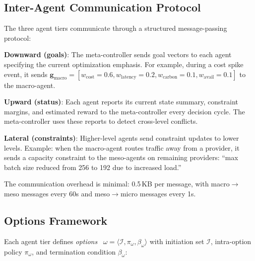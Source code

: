 \documentclass[conference,10pt]{IEEEtran}
\begin{document}
\subsection{Inter-Agent Communication Protocol}

The three agent tiers communicate through a structured message-passing protocol:

\textbf{Downward (goals)}: The meta-controller sends goal vectors to each agent specifying the current optimization emphasis. For example, during a cost spike event, it sends $\mathbf{g}_{\text{macro}} = [w_{\text{cost}}=0.6, w_{\text{latency}}=0.2, w_{\text{carbon}}=0.1, w_{\text{avail}}=0.1]$ to the macro-agent.

\textbf{Upward (status)}: Each agent reports its current state summary, constraint margins, and estimated reward to the meta-controller every decision cycle. The meta-controller uses these reports to detect cross-level conflicts.

\textbf{Lateral (constraints)}: Higher-level agents send constraint updates to lower levels. Example: when the macro-agent routes traffic away from a provider, it sends a capacity constraint to the meso-agents on remaining providers: ``max batch size reduced from 256 to 192 due to increased load.''

The communication overhead is minimal: 0.5\,KB per message, with macro$\to$meso messages every 60s and meso$\to$micro messages every 1s.

\subsection{Options Framework}

Each agent tier defines \emph{options}~\cite{sutton1999options} $\omega = \langle \mathcal{I}, \pi_\omega, \beta_\omega \rangle$ with initiation set $\mathcal{I}$, intra-option policy $\pi_\omega$, and termination condition $\beta_\omega$:

\begin{table}[!htbp]
\caption{Hierarchical Options Definition}
\label{tab:options}
\centering\scriptsize
{}
\end{table}
\end{document}
